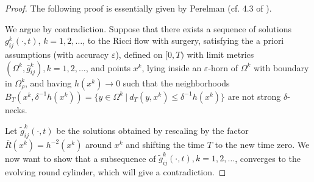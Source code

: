 \vskip 1.0cm

\begin{proof}
   The following proof is essentially given by Perelman
(cf. 4.3 of \cite{P2}).

We argue by contradiction. Suppose that there exists a sequence of
solutions $g^k_{ij}(\cdot,t)$, $k=1,2,\ldots$, to the Ricci flow
with surgery, satisfying the a priori assumptions (with accuracy
$\varepsilon$), defined on $[0,T)$ with limit metrics
$(\Omega^k,\bar{g}^k_{ij}), k=1, 2, \ldots$, and points $x^k$,
lying inside an $\varepsilon$-horn of $\Omega^k$ with boundary in
$\Omega_\rho^k$, and having $h(x^k)\rightarrow0$ such that the
neighborhoods $B_T(x^k,\delta^{-1}h(x^k))=\{y\in\Omega^k\ |\
d_T(y,x^k)\leq \delta^{-1}h(x^k)\}$ are not strong $\delta$-necks.

Let $\widetilde{g}^k_{ij}(\cdot,t)$ be the solutions obtained by
rescaling by the factor $\bar{R}(x^k)=h^{-2}(x^k)$ around $x^k$
and shifting the time $T$ to the new time zero. We now want to
show that a subsequence of
$\widetilde{g}^k_{ij}(\cdot,t),k=1,2,\ldots$, converges to the
evolving round cylinder, which will give a contradiction.


\end{proof}
